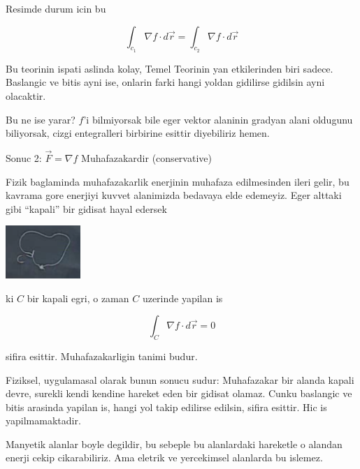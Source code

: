 \documentclass[12pt,fleqn]{article}
\begin{document}
Resimde durum icin bu

\[ \int_{c_1}\nabla f \cdot d\vec{r} =  \int_{c_2}\nabla f \cdot d\vec{r} \]

Bu teorinin ispati aslinda kolay, Temel Teorinin yan etkilerinden biri
sadece. Baslangic ve bitis ayni ise, onlarin farki hangi yoldan gidilirse
gidilsin ayni olacaktir. 

Bu ne ise yarar? $f$'i bilmiyorsak bile eger vektor alaninin gradyan alani
oldugunu biliyorsak, cizgi entegralleri birbirine esittir diyebiliriz hemen. 

Sonuc 2: $\vec{F} = \nabla f$ Muhafazakardir (conservative)

Fizik baglaminda muhafazakarlik enerjinin muhafaza edilmesinden ileri
gelir, bu kavrama gore enerjiyi kuvvet alanimizda bedavaya elde
edemeyiz. Eger alttaki gibi ``kapali'' bir gidisat hayal edersek

\includegraphics[height=2cm]{20_8.png}

ki $C$ bir kapali egri, o zaman $C$ uzerinde yapilan is

\[ \int_{C}\nabla f \cdot d\vec{r} = 0\]

sifira esittir. Muhafazakarligin tanimi budur. 

Fiziksel, uygulamasal olarak bunun sonucu sudur: Muhafazakar bir alanda
kapali devre, surekli kendi kendine hareket eden bir gidisat olamaz. Cunku
baslangic ve bitis arasinda yapilan is, hangi yol takip edilirse edilsin,
sifira esittir. Hic is yapilmamaktadir. 

Manyetik alanlar boyle degildir, bu sebeple bu alanlardaki hareketle o
alandan enerji cekip cikarabiliriz. Ama eletrik ve yercekimsel alanlarda bu
islemez. 
\end{document}

